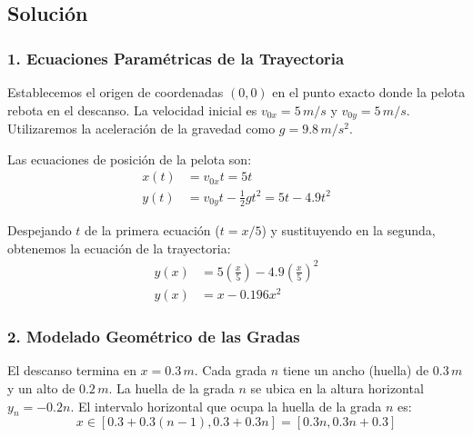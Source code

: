 \documentclass[12pt, a4paper]{article}
\begin{document}
\begin{center}
\end{center}

\subsection*{Solución}

\subsubsection*{1. Ecuaciones Paramétricas de la Trayectoria}
Establecemos el origen de coordenadas $(0,0)$ en el punto exacto donde la pelota rebota en el descanso. La velocidad inicial es $v_{0x} = 5 \, \si{m/s}$ y $v_{0y} = 5 \, \si{m/s}$. Utilizaremos la aceleración de la gravedad como $g = 9.8 \, \si{m/s^2}$.

Las ecuaciones de posición de la pelota son:
\begin{align*}
x(t) &= v_{0x} t = 5t \\
y(t) &= v_{0y} t - \frac{1}{2} g t^2 = 5t - 4.9t^2
\end{align*}

Despejando $t$ de la primera ecuación ($t = x/5$) y sustituyendo en la segunda, obtenemos la ecuación de la trayectoria:
\begin{align*}
y(x) &= 5\left(\frac{x}{5}\right) - 4.9\left(\frac{x}{5}\right)^2 \\
y(x) &= x - 0.196x^2
\end{align*}

\subsubsection*{2. Modelado Geométrico de las Gradas}
El descanso termina en $x = 0.3 \, \si{m}$.
Cada grada $n$ tiene un ancho (huella) de $0.3 \, \si{m}$ y un alto de $0.2 \, \si{m}$.
La huella de la grada $n$ se ubica en la altura horizontal $y_n = -0.2n$.
El intervalo horizontal que ocupa la huella de la grada $n$ es:
$$ x \in [0.3 + 0.3(n-1), 0.3 + 0.3n] = [0.3n, 0.3n + 0.3] $$
\end{document}
